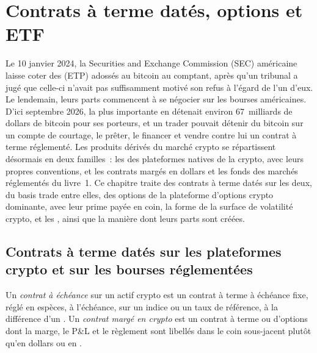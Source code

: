 \chapter{Contrats à terme datés, options et ETF}\label{ch:m3:dated-futures-options-and-etfs}

Le 10 janvier 2024, la Securities and Exchange Commission (SEC) américaine laisse coter des  (ETP) adossés au bitcoin au comptant, après qu'un tribunal
a jugé que celle-ci n'avait pas suffisamment motivé son refus à l'égard de l'un d'eux. Le
lendemain, leurs parts commencent à se négocier sur les bourses américaines. D'ici septembre 2026, la plus importante en détenait environ
67~milliards de dollars de bitcoin pour ses porteurs, et un trader pouvait détenir du bitcoin sur un compte de courtage, le prêter, le financer
et vendre contre lui un contrat à terme réglementé. Les produits dérivés du marché crypto se répartissent désormais en deux familles~: les
 des plateformes natives de la crypto, avec leurs propres conventions, et les contrats margés en dollars
et les fonds des marchés réglementés du livre~1. Ce chapitre traite des contrats à terme datés sur
les deux, du basis trade entre elles, des options de la plateforme d'options crypto dominante, avec leur prime
payée en coin, la forme de la surface de volatilité crypto, et les , ainsi que la manière dont leurs
parts sont créées.

\section{Contrats à terme datés sur les plateformes crypto et sur les bourses réglementées}

\begin{definition}\label{def:m3:dated-futures-options-and-etfs:dated}
Un \emph{contrat à échéance} sur un actif crypto est un contrat à terme à échéance fixe,
réglé en espèces, à l'échéance, sur un indice ou un taux de référence, à la différence d'un .
Un \emph{contrat margé en crypto} est un contrat à terme ou d'options dont la marge,
le P\&L et le règlement sont libellés dans le coin sous-jacent plutôt qu'en dollars ou en .
\end{definition}

